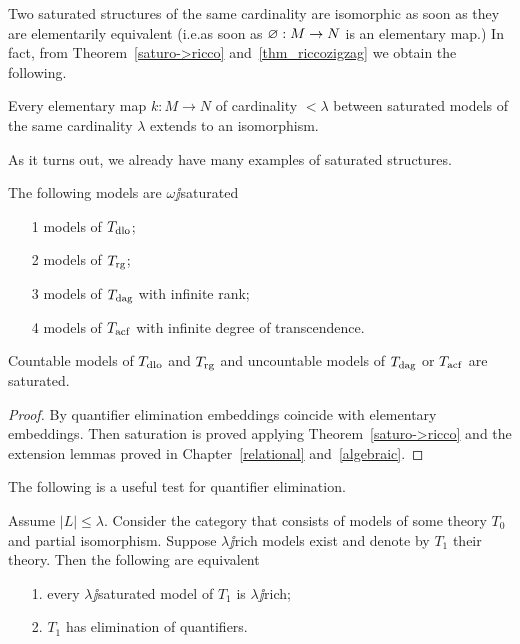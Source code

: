\documentclass[creche.tex]{subfiles}
\begin{document}
Two saturated structures of the same cardinality are isomorphic as soon as they are elementarily equivalent (i.e.\@ as soon as $\varnothing:M\to N$ is an elementary map.) In fact, from Theorem~\ref{saturo->ricco} and~\ref{thm_riccozigzag} we obtain the following.

\begin{corollary}
Every elementary map $k:M\to N$ of cardinality $<\lambda$ between saturated models of the same cardinality $\lambda$ extends to an isomorphism.\QED
\end{corollary}

As it turns out, we already have many examples of saturated structures.

\begin{corollary}
The following models are $\omega\jj$saturated
\begin{itemize}
\item[1] models of $T_{\rm dlo}$;
\item[2] models of $T_{\rm rg}$;
\item[3] models of $T_{\rm dag}$ with infinite rank;
\item[4] models of $T_{\rm acf}$ with infinite degree of transcendence.
\end{itemize}
Countable models of $T_{\rm dlo}$ and $T_{\rm rg}$ and uncountable models of $T_{\rm dag}$ or $T_{\rm acf}$ are saturated. 
\end{corollary}
\begin{proof}
By quantifier elimination embeddings coincide with elementary embeddings. Then saturation is proved applying Theorem~\ref{saturo->ricco} and the extension lemmas proved in Chapter~\ref{relational} and~\ref{algebraic}.
\end{proof}

The following is a useful test for quantifier elimination.

\begin{theorem}\label{thm_ricchezza_saturazione_QE}
Assume $|L|\le\lambda$. Consider the category that consists of models of some theory $T_0$ and partial isomorphism. Suppose $\lambda\jj$rich models exist and denote by $T_1$ their theory. Then the following are equivalent
\begin{itemize}
\item[1.] every $\lambda\jj$saturated model of $T_1$ is $\lambda\jj$rich;
\item[2.] $T_1$ has elimination of quantifiers.
\end{itemize}
\end{theorem}
\end{document}

